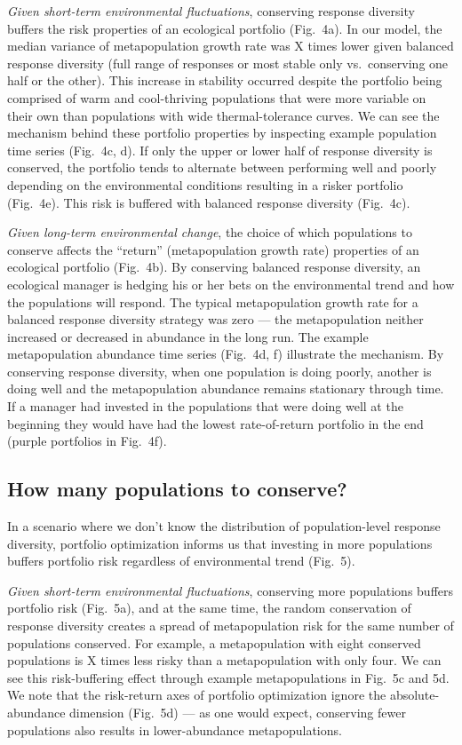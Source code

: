 \emph{Given short-term environmental fluctuations}, conserving response diversity buffers the risk properties of an ecological portfolio (Fig.~4a). In our model, the median variance of metapopulation growth rate was X times lower given balanced response diversity (full range of responses or most stable only vs.~conserving one half or the other). This increase in stability occurred despite the portfolio being comprised of warm and cool-thriving populations that were more variable on their own than populations with wide thermal-tolerance curves. We can see the mechanism behind these portfolio properties by inspecting example population time series (Fig.~4c, d). If only the upper or lower half of response diversity is conserved, the portfolio tends to alternate between performing well and poorly depending on the environmental conditions resulting in a risker portfolio (Fig.~4e). This risk is buffered with balanced response diversity (Fig.~4c).

\emph{Given long-term environmental change}, the choice of which populations to conserve affects the ``return'' (metapopulation growth rate) properties of an ecological portfolio (Fig.~4b). By conserving balanced response diversity, an ecological manager is hedging his or her bets on the environmental trend and how the populations will respond. The typical metapopulation growth rate for a balanced response diversity strategy was zero --- the metapopulation neither increased or decreased in abundance in the long run. The example metapopulation abundance time series (Fig.~4d, f) illustrate the mechanism. By conserving response diversity, when one population is doing poorly, another is doing well and the metapopulation abundance remains stationary through time. If a manager had invested in the populations that were doing well at the beginning they would have had the lowest rate-of-return portfolio in the end (purple portfolios in Fig.~4f).

\subsection{How many populations to conserve?}

In a scenario where we don't know the distribution of population-level response diversity, portfolio optimization informs us that investing in more populations buffers portfolio risk regardless of environmental trend (Fig.~5).

\emph{Given short-term environmental fluctuations}, conserving more populations buffers portfolio risk (Fig.~5a), and at the same time, the random conservation of response diversity creates a spread of metapopulation risk for the same number of populations conserved. For example, a metapopulation with eight conserved populations is X times less risky than a metapopulation with only four. We can see this risk-buffering effect through example metapopulations in Fig.~5c and 5d. We note that the risk-return axes of portfolio optimization ignore the absolute-abundance dimension (Fig.~5d) --- as one would expect, conserving fewer populations also results in lower-abundance metapopulations.

